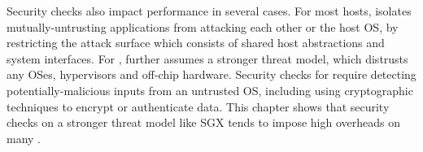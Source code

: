 Security checks also
impact \thehostabi{} performance
in several cases.
For most hosts, %
\graphene{}
isolates
mutually-untrusting applications from attacking each other or the host OS, %
by restricting the attack surface which consists of shared host abstractions and system interfaces.
For \sgx{},
\graphene{} further assumes a stronger threat model,
which distrusts any OSes, hypervisors and off-chip hardware.
Security checks for \sgx{}
require
detecting potentially-malicious inputs
from an untrusted OS,
including using cryptographic techniques
to encrypt or authenticate data.
This chapter shows that
security checks on a stronger threat model like SGX
tends to impose high overheads
on many \hostapis{}.

